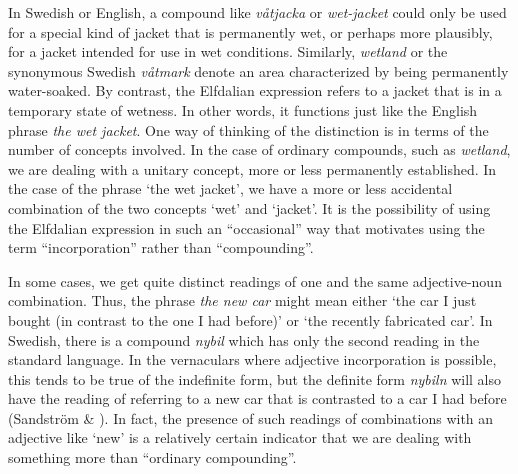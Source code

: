 \begin{styleBodyTextFirst}
In Swedish or English, a compound like \textit{våtjacka} or \textit{wet-jacket} could only be used for a special kind of jacket that is permanently wet, or perhaps more plausibly, for a jacket intended for use in wet conditions. Similarly, \textit{wetland} or the synonymous Swedish \textit{våtmark} denote an area characterized by being permanently water-soaked. By contrast, the Elfdalian expression refers to a jacket that is in a temporary state of wetness. In other words, it functions just like the English phrase \textit{the wet jacket}. One way of thinking of the distinction is in terms of the number of concepts involved. In the case of ordinary compounds, such as \textit{wetland}, we are dealing with a unitary concept, more or less permanently established. In the case of the phrase ‘the wet jacket’, we have a more or less accidental combination of the two concepts ‘wet’ and ‘jacket’. It is the possibility of using the Elfdalian expression in such an “occasional” way that motivates using the term “incorporation” rather than “compounding”. 

\end{styleBodyTextFirst}

\begin{styleBodytextC}
In some cases, we get quite distinct readings of one and the same adjective-noun combination. Thus, the phrase \textit{the new car} might mean either ‘the car I just bought (in contrast to the one I had before)’ or ‘the recently fabricated car’. In Swedish, there is a compound \textit{nybil} which has only the second reading in the standard language. In the vernaculars where adjective incorporation is possible, this tends to be true of the indefinite form, but the definite form \textit{nybiln }will also have the reading of referring to a new car that is contrasted to a car I had before (Sandström \& \citet[91]{Holmberg2003}). In fact, the presence of such readings of combinations with an adjective like ‘new’ is a relatively certain indicator that we are dealing with something more than “ordinary compounding”.

\end{styleBodytextC}

